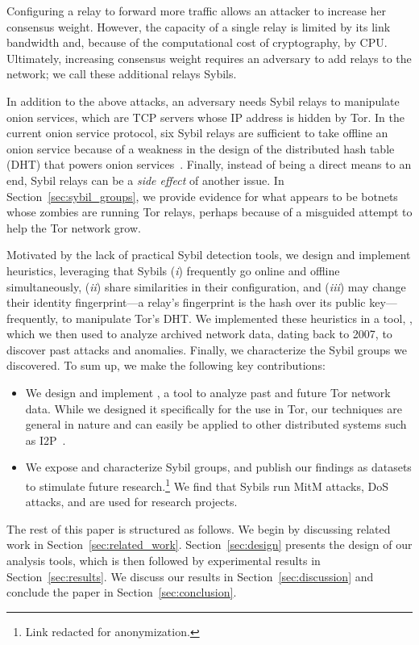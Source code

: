 Configuring a relay to forward more traffic allows an attacker to increase her
consensus weight.  However, the capacity of a single relay is limited by its
link bandwidth and, because of the computational cost of cryptography, by CPU.
Ultimately, increasing consensus weight requires an adversary to add relays to
the network; we call these additional relays Sybils.

In addition to the above attacks, an adversary needs Sybil relays to manipulate
onion services, which are TCP servers whose IP address is hidden by Tor.  In the
current onion service protocol, six Sybil relays are sufficient to take offline
an onion service because of a weakness in the design of the distributed hash
table (DHT) that powers onion services~\cite{Biryukov2013a}.  Finally, instead
of being a direct means to an end, Sybil relays can be a \emph{side effect} of
another issue.  In Section~\ref{sec:sybil_groups}, we provide evidence for what
appears to be botnets whose zombies are running Tor relays, perhaps because of a
misguided attempt to help the Tor network grow.

Motivated by the lack of practical Sybil detection tools, we design and
implement heuristics, leveraging that Sybils (\emph{i}) frequently go online and
offline simultaneously, (\emph{ii}) share similarities in their configuration,
and (\emph{iii}) may change their identity fingerprint---a relay's fingerprint
is the hash over its public key---frequently, to manipulate Tor's DHT.  We
implemented these heuristics in a tool, \sys, which we then used to analyze
archived network data, dating back to 2007, to discover past attacks and
anomalies.  Finally, we characterize the Sybil groups we discovered.  To sum up,
we make the following key contributions:
\begin{itemize}
	\item We design and implement \sys, a tool to analyze past and future Tor
		network data.  While we designed it specifically for the use in Tor, our
		techniques are general in nature and can easily be applied to other
		distributed systems such as I2P~\cite{i2p}.
	\item We expose and characterize Sybil groups, and publish our findings as
		datasets to stimulate future research.\footnote{Link redacted for
		anonymization.}  We find that Sybils run MitM attacks, DoS attacks, and
		are used for research projects.
\end{itemize}

The rest of this paper is structured as follows.  We begin by discussing
related work in Section~\ref{sec:related_work}.  Section~\ref{sec:design}
presents the design of our analysis tools, which is then followed by
experimental results in Section~\ref{sec:results}.  We discuss our results in
Section~\ref{sec:discussion} and conclude the paper in
Section~\ref{sec:conclusion}.
